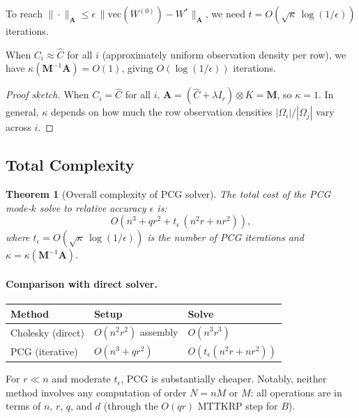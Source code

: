 \documentclass[12pt]{article}
\newtheorem{theorem}{Theorem}
\theoremstyle{definition}
\begin{document}
To reach $\|\cdot\|_{\mathbf{A}} \leq \epsilon\,\|\mathrm{vec}(W^{(0)}) - W^*\|_{\mathbf{A}}$, we need $t = O(\sqrt{\kappa}\,\log(1/\epsilon))$ iterations.

\begin{proposition}
When $C_i \approx \hat{C}$ for all $i$ (approximately uniform observation density per row), we have $\kappa(\mathbf{M}^{-1}\mathbf{A}) = O(1)$, giving $O(\log(1/\epsilon))$ iterations.
\end{proposition}

\begin{proof}[Proof sketch]
When $C_i = \hat{C}$ for all $i$, $\mathbf{A} = (\hat{C} + \lambda I_r)\otimes K = \mathbf{M}$, so $\kappa = 1$. In general, $\kappa$ depends on how much the row observation densities $|\Omega_i|/|\Omega_j|$ vary across $i$.
\end{proof}

\subsection{Total Complexity}

\begin{theorem}[Overall complexity of PCG solver]
The total cost of the PCG mode-$k$ solve to relative accuracy $\epsilon$ is:
\[
O\!\left(n^3 + qr^2 + t_\epsilon\,(n^2r + nr^2)\right),
\]
where $t_\epsilon = O(\sqrt{\kappa}\,\log(1/\epsilon))$ is the number of PCG iterations and $\kappa = \kappa(\mathbf{M}^{-1}\mathbf{A})$.
\end{theorem}

\paragraph{Comparison with direct solver.}
\begin{center}
\begin{tabular}{lll}
\hline
Method & Setup & Solve \\
\hline
Cholesky (direct) & $O(n^2r^2)$ assembly & $O(n^3r^3)$ \\
PCG (iterative) & $O(n^3 + qr^2)$ & $O(t_\epsilon(n^2r + nr^2))$ \\
\hline
\end{tabular}
\end{center}

For $r \ll n$ and moderate $t_\epsilon$, PCG is substantially cheaper. Notably, neither method involves any computation of order $N = nM$ or $M$: all operations are in terms of $n$, $r$, $q$, and $d$ (through the $O(qr)$ MTTKRP step for $B$).
\end{document}
